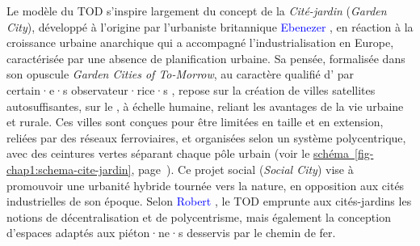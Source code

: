 \begin{refsegment}
Le modèle du \acrshort{TOD} s’inspire largement du concept de la \textsl{Cité-jardin} (\textsl{Garden City}), développé à l’origine par l’urbaniste britannique \textcolor{blue}{Ebenezer} \textcolor{blue}{\textcite{howard_-morrow_1898}}, en réaction à la croissance urbaine anarchique qui a accompagné l’industrialisation en Europe, caractérisée par une absence de planification urbaine. Sa pensée, formalisée dans son opuscule \textsl{Garden Cities of To-Morrow}, au caractère qualifié d’ par certain·e·s observateur·rice·s \textcolor{blue}{\autocite[7]{cavin_cites-jardins_2007}}, repose sur la création de villes satellites autosuffisantes, sur le  \textcolor{blue}{\autocite[9]{fath_entre_2007}}, à échelle humaine, reliant les avantages de la vie urbaine et rurale. Ces villes sont conçues pour être limitées en taille et en extension, reliées par des réseaux ferroviaires, et organisées selon un système polycentrique, avec des ceintures vertes séparant chaque pôle urbain (voir le \hyperref[fig-chap1:schema-cite-jardin]{schéma~\ref{fig-chap1:schema-cite-jardin}}, page~\pageref{fig-chap1:schema-cite-jardin}). Ce projet social (\textsl{Social City}) vise à promouvoir une urbanité hybride tournée vers la nature, en opposition aux cités industrielles de son époque. Selon \textcolor{blue}{Robert} \textcolor{blue}{\textcite[38]{fishman_open_2011}}, le \acrshort{TOD} emprunte aux cités-jardins les notions de décentralisation et de polycentrisme, mais également la conception d'espaces adaptés aux piéton·ne·s desservis par le chemin de fer.


\end{refsegment}
